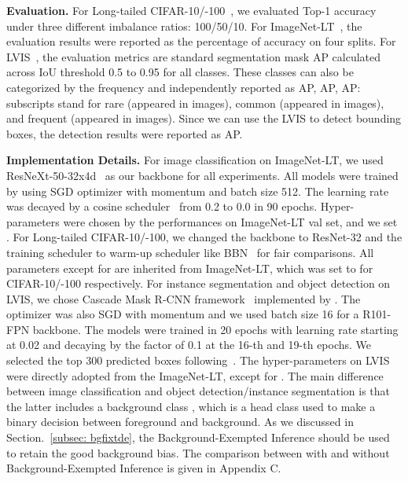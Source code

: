 \documentclass{article}
\begin{document}
\textbf{Evaluation.} For Long-tailed CIFAR-10/-100~\cite{cao2019learning, zhou2019bbn}, we evaluated Top-1 accuracy under three different imbalance ratios: 100/50/10. For ImageNet-LT~\cite{liu2019large}, the evaluation results were reported as the percentage of accuracy on four splits. For LVIS~\cite{gupta2019lvis}, the evaluation metrics are standard segmentation mask AP calculated across IoU threshold 0.5 to 0.95 for all classes. These classes can also be categorized by the frequency and independently reported as AP, AP, AP: subscripts  stand for rare (appeared in  images), common (appeared in  images), and frequent (appeared in  images). Since we can use the LVIS to detect bounding boxes, the detection results were reported as AP.


\textbf{Implementation Details.} For image classification on ImageNet-LT, we used ResNeXt-50-32x4d~\cite{xie2017aggregated} as our backbone for all experiments. All models were trained by using SGD optimizer with momentum  and batch size 512. The learning rate was decayed by a cosine scheduler~\cite{loshchilov2016sgdr} from 0.2 to 0.0 in 90 epochs. Hyper-parameters were chosen by the performances on ImageNet-LT val set, and we set . For Long-tailed CIFAR-10/-100, we changed the backbone to ResNet-32 and the training scheduler to warm-up scheduler like BBN~\cite{zhou2019bbn} for fair comparisons. All parameters except for  are inherited from ImageNet-LT, which was set to  for CIFAR-10/-100 respectively. For instance segmentation and object detection on LVIS, we chose Cascade Mask R-CNN framework~\cite{cai2018cascade} implemented by \cite{mmdetection}. The optimizer was also SGD with momentum  and we used batch size 16 for a R101-FPN backbone. The models were trained in 20 epochs with learning rate starting at 0.02 and decaying by the factor of 0.1 at the 16-th and 19-th epochs. We selected the top 300 predicted boxes following~\cite{gupta2019lvis, tan2020equalization}. The hyper-parameters on LVIS were directly adopted from the ImageNet-LT, except for . The main difference between image classification and object detection/instance segmentation is that the latter includes a background class , which is a head class used to make a binary decision between foreground and background. As we discussed in Section.~\ref{subsec: bgfixtde}, the Background-Exempted Inference should be used to retain the good background bias. The comparison between with and without Background-Exempted Inference is given in Appendix C.
\end{document}
